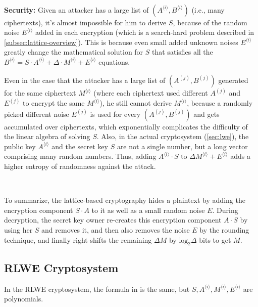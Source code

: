 $ $

\noindent \textbf{Security: } Given an attacker has a large list of $(A^{\langle i \rangle}, B^{\langle i \rangle})$ (i.e., many ciphertexts), it's almost impossible for him to derive $S$, because of the random noise $E^{\langle i \rangle}$ added in each encryption (which is a search-hard problem described in \autoref{subsec:lattice-overview}). This is because even small added unknown noises $E^{\langle i \rangle}$ greatly change the mathematical solution for $S$ that satisfies all the $B^{\langle i \rangle} = S \cdot A^{\langle i \rangle} + \Delta \cdot M^{\langle i \rangle} + E^{\langle i \rangle}$ equations. 


Even in the case that the attacker has a large list of $(A^{(j)}, B^{(j)})$ generated for the same ciphertext $M^{\langle i \rangle}$ (where each ciphertext used different $A^{(j)}$ and $E^{(j)}$ to encrypt the same $M^{\langle i \rangle}$), he still cannot derive $M^{\langle i \rangle}$, because a randomly picked different noise $E^{(j)}$ is used for every $(A^{(j)}, B^{(j)})$ and gets accumulated over ciphertexts, which exponentially complicates the difficulty of the linear algebra of solving $S$. Also, in the actual cryptosystem (\autoref{sec:lwe}), the public key $A^{\langle i \rangle}$ and the secret key $S$ are not a single number, but a long vector comprising many random numbers. Thus, adding $A^{\langle i \rangle }\cdot S$ to $\Delta M^{\langle i \rangle} + E^{\langle i \rangle}$ adds a higher entropy of randomness against the attack. 

$ $

To summarize, the lattice-based cryptography hides a plaintext by adding the encryption component $S \cdot A$ to it as well as a small random noise $E$. During decryption, the secret key owner re-creates this encryption component $A \cdot S$ by using her $S$ and removes it, and then also removes the noise $E$ by the rounding technique, and finally right-shifts the remaining $\Delta M$ by $\text{log}_2 \Delta$ bits to get $M$.

\subsection{RLWE Cryptosystem}

In the RLWE cryptosystem, the formula in \tboxlabel{\ref*{subsec:lattice-scheme}} is the same, but $S, A^{\langle i \rangle}, M^{\langle i \rangle}, E^{\langle i \rangle}$ are polynomials. 